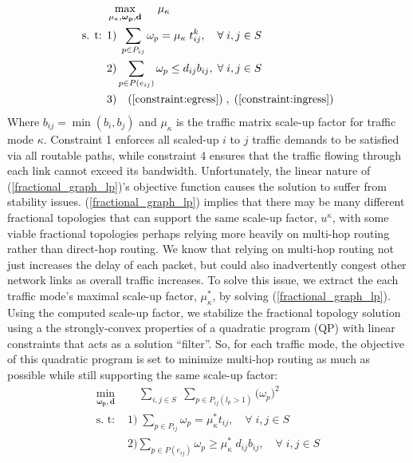 \documentclass[sigconf]{acmart}
\theoremstyle{definition}
\begin{document}
\begin{appendices}
\begin{equation}
\begin{aligned}
 & \max\limits_{\mu_\kappa, \boldsymbol{\omega_p}, \mathbf{d}} \; \quad \mu_{\kappa} \\
\text{s. t: } & 1) \; \sum_{p \in P_{ij}} \omega_{p} = \mu_{\kappa} \; t_{ij}^k, \quad \forall \; i, j \in S \\
& 2) \sum_{p \in P(e_{ij})} \omega_{p} \leq d_{ij} b_{ij}, \; \forall \; i, j \in S\\
& 3) \quad (\ref{constraint:egress})\; , \; (\ref{constraint:ingress})
\end{aligned}\label{fractional_graph_lp}
\end{equation}
Where $b_{ij} = \min(b_i, b_j)$ and $\mu_{\kappa}$ is the traffic matrix scale-up factor for traffic mode $\kappa$. Constraint 1 enforces all scaled-up $i$ to $j$ traffic demands to be satisfied via all routable paths, while constraint 4 ensures that the traffic flowing through each link cannot exceed its bandwidth. Unfortunately, the linear nature of (\ref{fractional_graph_lp})'s objective function causes the solution to suffer from stability issues. (\ref{fractional_graph_lp}) implies that there may be many different fractional topologies that can support the same scale-up factor, $u^\kappa$, with some viable fractional topologies perhaps relying more heavily on multi-hop routing rather than direct-hop routing. We know that relying on multi-hop routing not just increases the delay of each packet, but could also inadvertently congest other network links as overall traffic increases. To solve this issue, we extract the each traffic mode's maximal scale-up factor, $\mu_\kappa^{*}$, by solving (\ref{fractional_graph_lp}). Using the computed scale-up factor, we stabilize the fractional topology solution using a the strongly-convex properties of a quadratic program (QP) with linear constraints that acts as a solution ``filter''. So, for each traffic mode, the objective of this quadratic program is set to minimize multi-hop routing as much as possible while still supporting the same scale-up factor:
\begin{equation}
\begin{aligned}
\min\limits_{\boldsymbol{\omega_p}, \mathbf{d}} \;& \quad \sum_{i, j \in S} \; \sum_{p \in P_{ij}(l_p > 1)}\big(\omega_{p}\big)^2 \\
\text{s. t: } & 1) \; \sum_{p \in P_{ij}} \omega_{p} = \mu_{\kappa}^* t_{ij}, \quad \forall \; i, j \in S \\
& 2) \sum\limits_{p \in P(e_{ij})} \omega_{p} \geq \mu_{\kappa}^* \; d_{ij} b_{ij}, \quad \forall \; i, j \in S\\

\end{aligned}
\end{equation}
\end{appendices}
\end{document}
